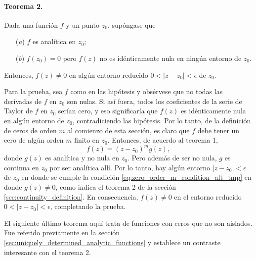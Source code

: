 \documentclass[a4paper]{report}
\begin{document}
\paragraph{Teorema 2.} Dada una función \(f\) y un punto \(z_0\), supóngase que
\begin{enumerate}
 \item[(\textit{a})] \(f\) es analítica en \(z_0\);
 \item[(\textit{b})] \(f(z_0)=0\) pero \(f(z)\) no es idénticamente nula en ningún entorno de \(z_0\).
\end{enumerate}
Entonces, \(f(z)\neq0\) en algún entorno reducido \(0<|z-z_0|<\epsilon\) de \(z_0\).

Para la prueba, sea \(f\) como en las hipótesis y obsérvese que no todas las derivadas de \(f\) en \(z_0\) son nulas. Si así fuera, todos los coeficientes de la serie de Taylor de \(f\) en \(z_0\) serían cero, y eso significaría que \(f(z)\) es idénticamente nula en algún entorno de \(z_0\), contradiciendo las hipótesis. Por lo tanto, de la definición de ceros de orden \(m\) al comienzo de esta sección, es claro que \(f\) debe tener un cero de algún orden \(m\) finito en \(z_0\). Entonces, de acuerdo al teorema 1,
\begin{equation}\label{eq:zero_order_m_condition_alt_tmp}
 f(z)=(z-z_0)^mg(z), 
\end{equation}
donde \(g(z)\) es analítica y no nula en \(z_0\). Pero además de ser no nula, \(g\) es continua en \(z_0\) por ser analítica allí. Por lo tanto, hay algún entorno \(|z-z_0|<\epsilon\) de \(z_0\) en donde se cumple la condición \ref{eq:zero_order_m_condition_alt_tmp} en donde \(g(z)\neq0\), como indica el teorema 2 de la sección \ref{sec:continuity_definition}. En consecuencia, \(f(z)\neq0\) en el entorno reducido \(0<|z-z_0|<\epsilon\), completando la prueba.

El siguiente último teorema aquí trata de funciones con ceros que no son aislados. Fue referido previamente en la sección \ref{sec:uniquely_determined_analytic_functions} y establece un contraste interesante con el teorema 2.
\end{document}
